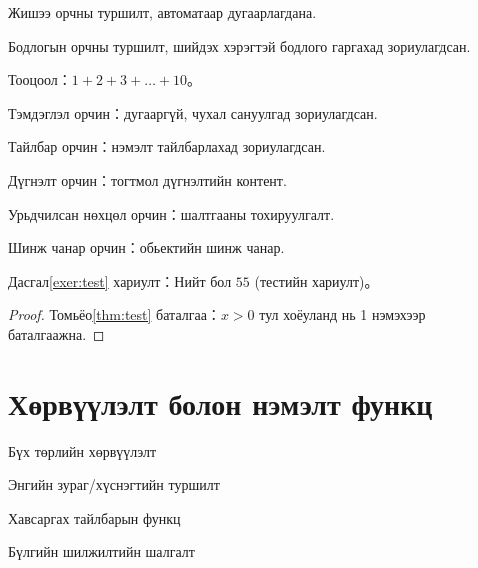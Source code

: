 \documentclass[nm]{../../elegantbook}
\begin{document}
\begin{definition}
\begin{theorem}
\begin{lemma}
\begin{corollary}
\begin{axiom}
\begin{postulate}
\begin{proposition}
\begin{example}\label{exa:test}
Жишээ орчны туршилт, автоматаар дугаарлагдана.
\end{example}

\begin{problem}\label{probl:test}
Бодлогын орчны туршилт, шийдэх хэрэгтэй бодлого гаргахад зориулагдсан.
\end{problem}

\begin{exercise}\label{exer:test}
Тооцоол：$1+2+3+\dots+10$。
\end{exercise}

\begin{note}
Тэмдэглэл орчин：дугааргүй, чухал сануулгад зориулагдсан.
\end{note}

\begin{remark}
Тайлбар орчин：нэмэлт тайлбарлахад зориулагдсан.
\end{remark}

\begin{conclusion}
Дүгнэлт орчин：тогтмол дүгнэлтийн контент.
\end{conclusion}

\begin{assumption}
Урьдчилсан нөхцөл орчин：шалтгааны тохируулгалт.
\end{assumption}

\begin{property}
Шинж чанар орчин：обьектийн шинж чанар.
\end{property}

\begin{solution}
Дасгал\ref{exer:test} хариулт：Нийт бол $55$ (тестийн хариулт)。
\end{solution}

\begin{proof}
Томьёо\ref{thm:test} баталгаа：$x>0$ тул хоёуланд нь 1 нэмэхээр баталгаажна.
\end{proof}

\chapter{Хөрвүүлэлт болон нэмэлт функц}
\begin{introduction}
\item Бүх төрлийн хөрвүүлэлт
\item Энгийн зураг/хүснэгтийн туршилт
\item Хавсаргах тайлбарын функц
\item Бүлгийн шилжилтийн шалгалт
\end{introduction}


\end{proposition}
\end{postulate}
\end{axiom}
\end{corollary}
\end{lemma}
\end{theorem}
\end{definition}
\end{document}
